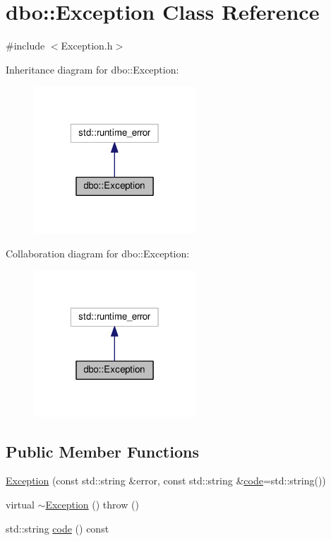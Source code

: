 \hypertarget{classdbo_1_1_exception}{\section{dbo\+:\+:Exception Class Reference}
\label{classdbo_1_1_exception}
}


{\ttfamily \#include $<$Exception.\+h$>$}



Inheritance diagram for dbo\+:\+:Exception\+:\nopagebreak
\begin{figure}[H]
\begin{center}
\leavevmode
\includegraphics[width=172pt]{classdbo_1_1_exception__inherit__graph}
\end{center}
\end{figure}


Collaboration diagram for dbo\+:\+:Exception\+:\nopagebreak
\begin{figure}[H]
\begin{center}
\leavevmode
\includegraphics[width=172pt]{classdbo_1_1_exception__coll__graph}
\end{center}
\end{figure}
\subsection*{Public Member Functions}
\begin{DoxyCompactItemize}
\item 
\hyperlink{classdbo_1_1_exception_a52d8037cc4cdcb4fc18651b5669b1621}{Exception} (const std\+::string \&error, const std\+::string \&\hyperlink{classdbo_1_1_exception_aae1affef09ea6691eb7e16ee1cc75edc}{code}=std\+::string())
\item 
virtual \hyperlink{classdbo_1_1_exception_a122aaa1fc274cf2ed943613ae28bb268}{$\sim$\+Exception} ()  throw ()
\item 
std\+::string \hyperlink{classdbo_1_1_exception_aae1affef09ea6691eb7e16ee1cc75edc}{code} () const 
\end{DoxyCompactItemize}


